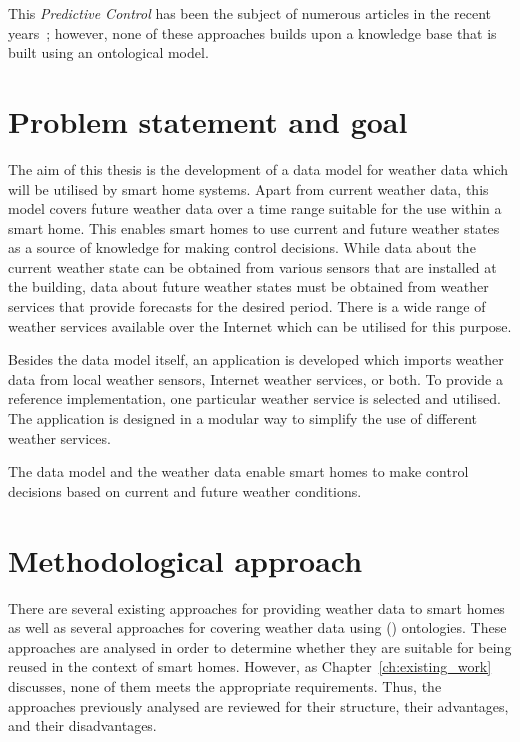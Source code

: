 This \emph{Predictive Control} has been the subject of numerous articles in the recent years~\cite{predictive_control1,predictive_control2,predictive_control3}; however, none of these approaches builds upon a knowledge base that is built using an ontological model.

\section{Problem statement and goal}

The aim of this thesis is the development of a data model for weather data which will be utilised by smart home systems. Apart from current weather data, this model covers future weather data over a time range suitable for the use within a smart home. This enables smart homes to use current and future weather states as a source of knowledge for making control decisions. While data about the current weather state can be obtained from various sensors that are installed at the building, data about future weather states must be obtained from weather services that provide forecasts for the desired period. There is a wide range of weather services available over the Internet which can be utilised for this purpose.

Besides the data model itself, an application is developed which imports weather data from local weather sensors, Internet weather services, or both. To provide a reference implementation, one particular weather service is selected and utilised. The application is designed in a modular way to simplify the use of different weather services.

The data model and the weather data enable smart homes to make control decisions based on current and future weather conditions.

\section{Methodological approach}

There are several existing approaches for providing weather data to smart homes as well as several approaches for covering weather data using () ontologies. These approaches are analysed in order to determine whether they are suitable for being reused in the context of smart homes. However, as Chapter~\ref{ch:existing_work} discusses, none of them meets the appropriate requirements. Thus, the approaches previously analysed are reviewed for their structure, their advantages, and their disadvantages.

